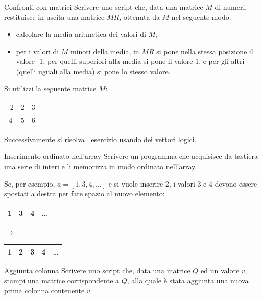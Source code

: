 \documentclass[aspectratio=169, handout]{beamer}
\begin{document}
\begin{frame}{Confronti con matrici}
Scrivere uno script che, data una matrice $M$ di numeri, restituisce in uscita una matrice $MR$, ottenuta da $M$ nel seguente modo:
\begin{itemize}
	\item calcolare la media aritmetica dei valori di $M$;
	\item per i valori di $M$ minori della media, in $MR$ si
pone nella stessa posizione il valore -1, per quelli superiori alla media si pone il valore 1, e per gli altri (quelli uguali alla media) si pone lo stesso valore.
\end{itemize}

Si utilizzi la seguente matrice $M$:
\begin{tabular}{|ccc|}
	\hline
	-2&2&3\\
	4&5&6\\
	\hline
\end{tabular}

\pause
Successivamente si risolva l'esercizio usando dei vettori logici.
\end{frame}

\begin{frame}{Inserimento ordinato nell'array}
Scrivere un programma che acquisisce da tastiera una serie di interi e li memorizza in modo ordinato nell'array.

\pause
    Se, per esempio, $a = [1, 3, 4, \dots]$ e si vuole inserire 2, i valori 3 e 4 devono essere spostati a destra per fare spazio al nuovo elemento:

\centering
\begin{tabular}{|c|c|c|c|}
	\hline
	1&3&4& \dots \\
	\hline
\end{tabular}
$\rightarrow$
\begin{tabular}{|c|c|c|c|c|}
	\hline
	1& \alert{2} &3&4& \dots \\
	\hline
\end{tabular}
\end{frame}


\begin{frame}{Aggiunta colonna}
Scrivere uno script che, data una matrice $Q$ ed un valore $v$, stampi una
matrice corrispondente a $Q$, alla quale è stata aggiunta una nuova prima
colonna contenente $v$.
\end{frame}
\end{document}
